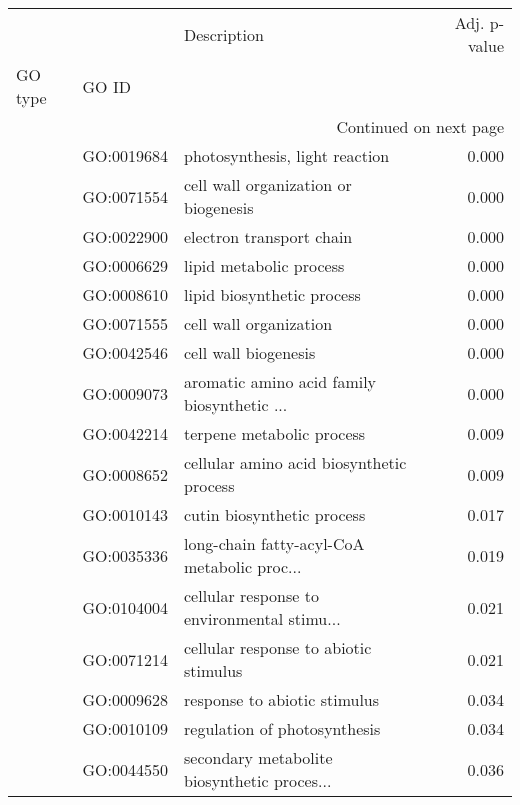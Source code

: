 \begin{longtable}{lllr}
\toprule
   &            &                                  Description &  Adj. p-value \\
GO type & GO ID &                                              &               \\
\midrule
\endhead
\midrule
\multicolumn{4}{r}{{Continued on next page}} \\
\midrule
\endfoot

\bottomrule
\endlastfoot
\multirow{22}{*}{BP} & GO:0019684 &               photosynthesis, light reaction &         0.000 \\
   & GO:0071554 &         cell wall organization or biogenesis &         0.000 \\
   & GO:0022900 &                     electron transport chain &         0.000 \\
   & GO:0006629 &                      lipid metabolic process &         0.000 \\
   & GO:0008610 &                   lipid biosynthetic process &         0.000 \\
   & GO:0071555 &                       cell wall organization &         0.000 \\
   & GO:0042546 &                         cell wall biogenesis &         0.000 \\
   & GO:0009073 &  aromatic amino acid family biosynthetic ... &         0.000 \\
   & GO:0042214 &                    terpene metabolic process &         0.009 \\
   & GO:0008652 &     cellular amino acid biosynthetic process &         0.009 \\
   & GO:0010143 &                   cutin biosynthetic process &         0.017 \\
   & GO:0035336 &  long-chain fatty-acyl-CoA metabolic proc... &         0.019 \\
   & GO:0104004 &  cellular response to environmental stimu... &         0.021 \\
   & GO:0071214 &        cellular response to abiotic stimulus &         0.021 \\
   & GO:0009628 &                 response to abiotic stimulus &         0.034 \\
   & GO:0010109 &                 regulation of photosynthesis &         0.034 \\
   & GO:0044550 &  secondary metabolite biosynthetic proces... &         0.036 \\

\end{longtable}
